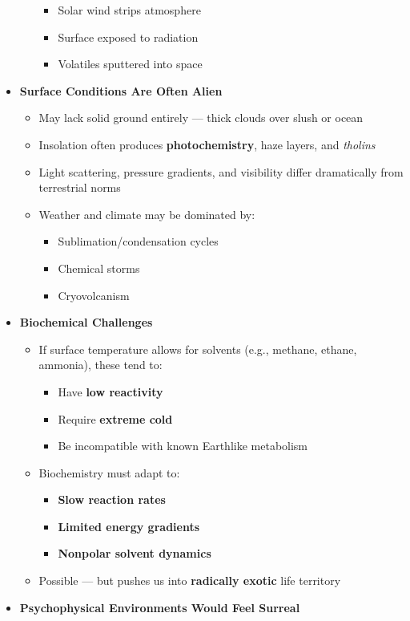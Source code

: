 \documentclass[
  letterpaper,
]{book}
\providecommand{\tightlist}{%
  \setlength{\itemsep}{0pt}\setlength{\parskip}{0pt}}
\begin{document}
\begin{itemize}
\begin{itemize}
    \begin{itemize}
    \tightlist
    \item
      Solar wind strips atmosphere
    \item
      Surface exposed to radiation
    \item
      Volatiles sputtered into space
    \end{itemize}
  \end{itemize}
\item
  \textbf{Surface Conditions Are Often Alien}

  \begin{itemize}
  \tightlist
  \item
    May lack solid ground entirely --- thick clouds over slush or ocean
  \item
    Insolation often produces \textbf{photochemistry}, haze layers, and
    \emph{tholins}
  \item
    Light scattering, pressure gradients, and visibility differ
    dramatically from terrestrial norms
  \item
    Weather and climate may be dominated by:

    \begin{itemize}
    \tightlist
    \item
      Sublimation/condensation cycles
    \item
      Chemical storms
    \item
      Cryovolcanism
    \end{itemize}
  \end{itemize}
\item
  \textbf{Biochemical Challenges}

  \begin{itemize}
  \tightlist
  \item
    If surface temperature allows for solvents (e.g., methane, ethane,
    ammonia), these tend to:

    \begin{itemize}
    \tightlist
    \item
      Have \textbf{low reactivity}
    \item
      Require \textbf{extreme cold}
    \item
      Be incompatible with known Earthlike metabolism
    \end{itemize}
  \item
    Biochemistry must adapt to:

    \begin{itemize}
    \tightlist
    \item
      \textbf{Slow reaction rates}
    \item
      \textbf{Limited energy gradients}
    \item
      \textbf{Nonpolar solvent dynamics}
    \end{itemize}
  \item
    Possible --- but pushes us into \textbf{radically exotic} life
    territory
  \end{itemize}
\item
  \textbf{Psychophysical Environments Would Feel Surreal}


\end{itemize}
\end{document}
